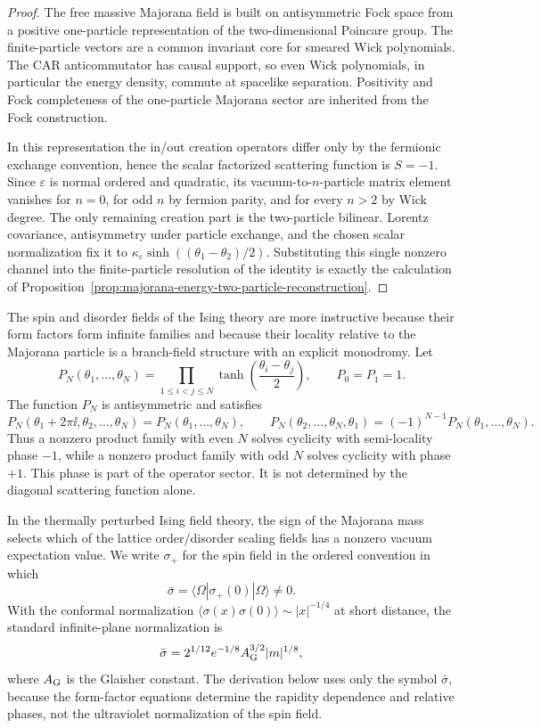 \begin{proof}
The free massive Majorana field is built on antisymmetric Fock space from a
positive one-particle representation of the two-dimensional Poincare group.
The finite-particle vectors are a common invariant core for smeared Wick
polynomials.  The CAR anticommutator has causal support, so even Wick
polynomials, in particular the energy density, commute at spacelike
separation.  Positivity and Fock completeness of the one-particle Majorana
sector are inherited from the Fock construction.

In this representation the in/out creation operators differ only by the
fermionic exchange convention, hence the scalar factorized scattering
function is \(S=-1\).  Since \(\varepsilon\) is normal ordered and quadratic,
its vacuum-to-\(n\)-particle matrix element vanishes for \(n=0\), for odd
\(n\) by fermion parity, and for every \(n>2\) by Wick degree.  The only
remaining creation part is the two-particle bilinear.  Lorentz covariance,
antisymmetry under particle exchange, and the chosen scalar normalization fix
it to
\(\kappa_\varepsilon\sinh((\theta_1-\theta_2)/2)\).  Substituting this single
nonzero channel into the finite-particle resolution of the identity is exactly
the calculation of
Proposition~\ref{prop:majorana-energy-two-particle-reconstruction}.
\end{proof}

The spin and disorder fields of the Ising theory are more instructive because
their form factors form infinite families and because their locality relative
to the Majorana particle is a branch-field structure with an explicit monodromy.
Let
\[
  P_N(\theta_1,\ldots,\theta_N)
  =
  \prod_{1\le i<j\le N}
  \tanh\!\left(\frac{\theta_i-\theta_j}{2}\right),
  \qquad P_0=P_1=1 .
\]
The function \(P_N\) is antisymmetric and satisfies
\[
  P_N(\theta_1+2\pi\ii,\theta_2,\ldots,\theta_N)
  =
  P_N(\theta_1,\ldots,\theta_N),
  \qquad
  P_N(\theta_2,\ldots,\theta_N,\theta_1)
  =
  (-1)^{N-1}P_N(\theta_1,\ldots,\theta_N).
\]
Thus a nonzero product family with even \(N\) solves cyclicity with
semi-locality phase \(-1\), while a nonzero product family with odd \(N\)
solves cyclicity with phase \(+1\).  This phase is part of the operator
sector.  It is not determined by the diagonal scattering function alone.

In the thermally perturbed Ising field theory, the sign of the Majorana mass
selects which of the lattice order/disorder scaling fields has a nonzero
vacuum expectation value.  We write \(\sigma_+\) for the spin field in the
ordered convention in which
\[
  \bar\sigma=\langle\Omega|\sigma_+(0)|\Omega\rangle\ne0 .
\]
With the conformal normalization
\(\langle\sigma(x)\sigma(0)\rangle\sim |x|^{-1/4}\) at short distance, the
standard infinite-plane normalization is
\[
  \bar\sigma
  =
  2^{1/12}e^{-1/8}A_{\rm G}^{3/2}|m|^{1/8},
\]
where \(A_{\rm G}\) is the Glaisher constant.  The derivation below uses only
the symbol \(\bar\sigma\), because the form-factor equations determine the
rapidity dependence and relative phases, not the ultraviolet normalization of
the spin field.

